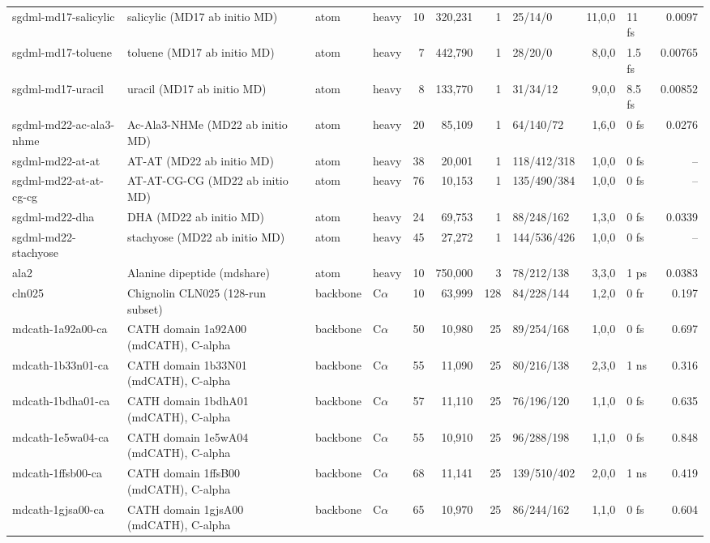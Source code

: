 \documentclass[10pt]{article}
\begin{document}
\begin{small}
\begin{longtable}{p{3.9cm}p{5.2cm}llrrrlrlr}
sgdml-md17-salicylic & salicylic (MD17 ab initio MD) & atom & heavy & 10 & 320,231 & 1 & 25/14/0 & 11,0,0 & 11 fs & 0.0097\\
sgdml-md17-toluene & toluene (MD17 ab initio MD) & atom & heavy & 7 & 442,790 & 1 & 28/20/0 & 8,0,0 & 1.5 fs & 0.00765\\
sgdml-md17-uracil & uracil (MD17 ab initio MD) & atom & heavy & 8 & 133,770 & 1 & 31/34/12 & 9,0,0 & 8.5 fs & 0.00852\\
sgdml-md22-ac-ala3-nhme & Ac-Ala3-NHMe (MD22 ab initio MD) & atom & heavy & 20 & 85,109 & 1 & 64/140/72 & 1,6,0 & 0 fs & 0.0276\\
sgdml-md22-at-at & AT-AT (MD22 ab initio MD) & atom & heavy & 38 & 20,001 & 1 & 118/412/318 & 1,0,0 & 0 fs & --\\
sgdml-md22-at-at-cg-cg & AT-AT-CG-CG (MD22 ab initio MD) & atom & heavy & 76 & 10,153 & 1 & 135/490/384 & 1,0,0 & 0 fs & --\\
sgdml-md22-dha & DHA (MD22 ab initio MD) & atom & heavy & 24 & 69,753 & 1 & 88/248/162 & 1,3,0 & 0 fs & 0.0339\\
sgdml-md22-stachyose & stachyose (MD22 ab initio MD) & atom & heavy & 45 & 27,272 & 1 & 144/536/426 & 1,0,0 & 0 fs & --\\
ala2 & Alanine dipeptide (mdshare) & atom & heavy & 10 & 750,000 & 3 & 78/212/138 & 3,3,0 & 1 ps & 0.0383\\
cln025 & Chignolin CLN025 (128-run subset) & backbone & C$\alpha$ & 10 & 63,999 & 128 & 84/228/144 & 1,2,0 & 0 fr & 0.197\\
mdcath-1a92a00-ca & CATH domain 1a92A00 (mdCATH), C-alpha & backbone & C$\alpha$ & 50 & 10,980 & 25 & 89/254/168 & 1,0,0 & 0 fs & 0.697\\
mdcath-1b33n01-ca & CATH domain 1b33N01 (mdCATH), C-alpha & backbone & C$\alpha$ & 55 & 11,090 & 25 & 80/216/138 & 2,3,0 & 1 ns & 0.316\\
mdcath-1bdha01-ca & CATH domain 1bdhA01 (mdCATH), C-alpha & backbone & C$\alpha$ & 57 & 11,110 & 25 & 76/196/120 & 1,1,0 & 0 fs & 0.635\\
mdcath-1e5wa04-ca & CATH domain 1e5wA04 (mdCATH), C-alpha & backbone & C$\alpha$ & 55 & 10,910 & 25 & 96/288/198 & 1,1,0 & 0 fs & 0.848\\
mdcath-1ffsb00-ca & CATH domain 1ffsB00 (mdCATH), C-alpha & backbone & C$\alpha$ & 68 & 11,141 & 25 & 139/510/402 & 2,0,0 & 1 ns & 0.419\\
mdcath-1gjsa00-ca & CATH domain 1gjsA00 (mdCATH), C-alpha & backbone & C$\alpha$ & 65 & 10,970 & 25 & 86/244/162 & 1,1,0 & 0 fs & 0.604\\

\end{longtable}
\end{small}
\end{document}
